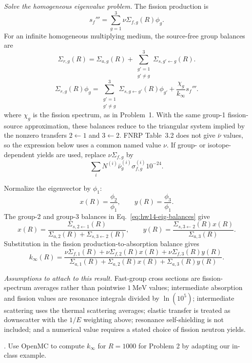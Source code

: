 \begin{adaptedsolution}
\noindent\textit{Solve the homogeneous eigenvalue problem.}
The fission production is
\[
s_f'''=\sum_{g=1}^3 \nu\Sigma_{f,g}(R)\phi_g .
\]
For an infinite homogeneous multiplying medium, the source-free group
balances are
\[
\Sigma_{r,g}(R)=\Sigma_{a,g}(R)
+\sum_{\substack{g'=1\\g'\ne g}}^3\Sigma_{s,g'\leftarrow g}(R).
\]
\begin{equation}
\Sigma_{r,g}(R)\phi_g
=\sum_{\substack{g'=1\\g'\ne g}}^3
 \Sigma_{s,g\leftarrow g'}(R)\phi_{g'}
 +\frac{\chi_g}{k_\infty}s_f'''.
\label{eq:hw14-eig-balances}
\end{equation}
where $\chi_g$ is the fission spectrum, as in Problem~1.  With the same
group-1 fission-source approximation, these balances reduce to the triangular
system implied by the nonzero transfers $2\leftarrow1$ and $3\leftarrow2$.
FNRP Table~3.2 does not give $\bar{\nu}$ values, so the expression below uses
a common named value $\nu$.  If group- or isotope-dependent yields are used,
replace $\nu\Sigma_{f,g}$ by
\[
\sum_i N^{(i)}\bar{\nu}^{(i)}_g\sigma_{f,g}^{(i)}10^{-24}.
\]

Normalize the eigenvector by $\phi_1$:
\[
x(R)=\frac{\phi_2}{\phi_1},\qquad y(R)=\frac{\phi_3}{\phi_1}.
\]
The group-2 and group-3 balances in Eq.~\eqref{eq:hw14-eig-balances} give
\[
x(R)=
\frac{\Sigma_{s,2\leftarrow1}(R)}
{\Sigma_{a,2}(R)+\Sigma_{s,3\leftarrow2}(R)},
\qquad
y(R)=\frac{\Sigma_{s,3\leftarrow2}(R)x(R)}{\Sigma_{a,3}(R)}.
\]
Substitution in the fission production-to-absorption balance gives
\[
\boxed{
k_\infty(R)=
\frac{\nu\Sigma_{f,1}(R)
+\nu\Sigma_{f,2}(R)x(R)+\nu\Sigma_{f,3}(R)y(R)}
{\Sigma_{a,1}(R)+\Sigma_{a,2}(R)x(R)+\Sigma_{a,3}(R)y(R)}
}.
\]

\noindent\textit{Assumptions to attach to this result.}
Fast-group cross sections are fission-spectrum averages rather than pointwise
$1~\mathrm{MeV}$ values; intermediate absorption and fission values are
resonance integrals divided by $\ln(10^5)$; intermediate scattering uses the
thermal scattering averages; elastic transfer is treated as downscatter with
the $1/E$ weighting above; resonance self-shielding is not included; and a
numerical value requires a stated choice of fission neutron yields.
\end{adaptedsolution}

\newpage

. Use OpenMC to compute $k_\infty$ for $R=1000$ for
Problem 2 by adapting our in-class example.

